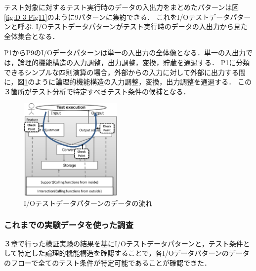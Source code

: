 \documentclass[10pt,a4j]{jarticle}
\begin{document}
テスト対象に対するテスト実行時のデータの入出力をまとめたパターンは図\ref{fig:D-3-Fig11}のように9パターンに集約できる．
これをI/Oテストデータパターンと呼ぶ.
I/Oテストデータパターンがテスト実行時のデータの入出力から見た全体集合となる．

P1からP9のI/Oデータパターンは単一の入出力の全体像となる．単一の入出力では，論理的機能構造の入力調整，出力調整，変換，貯蔵を通過する．
P1に分類できるシンプルな四則演算の場合，外部からの入力に対して外部に出力する間に，図\ref{fig:D-4-Fig7}のように論理的機能構造の入力調整，変換，出力調整を通過する．
この３箇所がテスト分析で特定すべきテスト条件の候補となる．
 \begin{figure}[htbp]
 \begin{center}
 \includegraphics[width=5cm]{./image/D-4-Fig7.png}
 \caption{I/Oテストデータパターンのデータの流れ}
 \label{fig:D-4-Fig7}
 \end{center}
 \end{figure}


\subsubsection{これまでの実験データを使った調査}
３章で行った検証実験の結果を基にI/Oテストデータパターンと，テスト条件として特定した論理的機能構造を確認することで，各I/Oデータパターンのデータのフローで全てのテスト条件が特定可能であることが確認できた．

%
\end{document}
